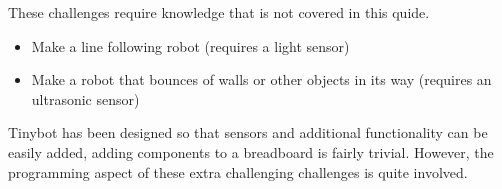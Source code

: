 \documentclass[a4paper,12pt]{article}
\begin{document}
\bigskip


These challenges require knowledge that is not covered in this quide.
\begin{itemize}
    \item Make a line following robot (requires a light sensor)
    \item Make a robot that bounces of walls or other objects in its way (requires an ultrasonic sensor)
\end{itemize}
Tinybot has been designed so that sensors and additional functionality can be easily added, adding components to a breadboard is fairly trivial. However, the programming aspect of these extra challenging challenges is quite involved.
\end{document}
